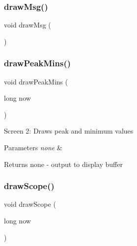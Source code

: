 \subsubsection{\texorpdfstring{draw\+Msg()}{drawMsg()}}
{\footnotesize\ttfamily void draw\+Msg (\begin{DoxyParamCaption}{ }\end{DoxyParamCaption})}

\hypertarget{_u_s_b___tester___o_l_e_d__128x64___beta__2_82_8ino_a5fdf539ee41d555f473ca2760a17000c}{}\label{_u_s_b___tester___o_l_e_d__128x64___beta__2_82_8ino_a5fdf539ee41d555f473ca2760a17000c} 
\subsubsection{\texorpdfstring{draw\+Peak\+Mins()}{drawPeakMins()}}
{\footnotesize\ttfamily void draw\+Peak\+Mins (\begin{DoxyParamCaption}\item[{long}]{now }\end{DoxyParamCaption})}

Screen 2\+: Draws peak and minimum values


\begin{DoxyParams}{Parameters}
{\em none} & \\
\hline
\end{DoxyParams}
\begin{DoxyReturn}{Returns}
none -\/ output to display buffer 
\end{DoxyReturn}
\hypertarget{_u_s_b___tester___o_l_e_d__128x64___beta__2_82_8ino_a9da71451af567b7d8a6459535dc861ec}{}\label{_u_s_b___tester___o_l_e_d__128x64___beta__2_82_8ino_a9da71451af567b7d8a6459535dc861ec} 
\subsubsection{\texorpdfstring{draw\+Scope()}{drawScope()}}
{\footnotesize\ttfamily void draw\+Scope (\begin{DoxyParamCaption}\item[{long}]{now }\end{DoxyParamCaption})}

